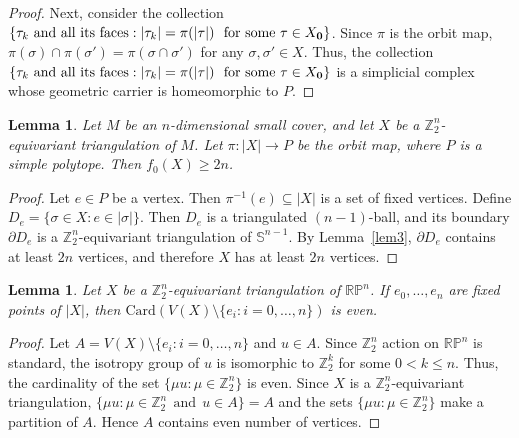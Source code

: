\documentclass[11pt]{amsart}
\numberwithin{equation}{section}
\newtheorem{lemma}[theorem]{Lemma}
\theoremstyle{definition}
\def \bb{\mathbb}
\def \ZZ{{\bb{Z}}}
\begin{document}
\begin{proof}
Next, consider the collection
$\{\tau_k \text{ and all its faces} : |\tau_k| = \pi(|\tau|) ~\mbox{ for some } \tau \in X_{\bf 0}\}$. Since $\pi$ is the orbit map, 
 $\pi(\sigma) \cap \pi(\sigma') = \pi(\sigma \cap \sigma')$
for any $\sigma,\sigma' \in X$.   Thus, the collection
$\{\tau_k \text{ and all its faces} : |\tau_k| = \pi(|\tau|) ~\mbox{ for some } \tau \in X_{\bf 0}\}$  is a simplicial complex whose geometric carrier is homeomorphic to $P$.
\end{proof}




\begin{lemma}
Let $M$ be an $n$-dimensional small cover, and let $X$ be a $\mathbb{Z}_2^n$-equivariant triangulation of $M$. Let $\pi \colon |X| \rightarrow P$ be the orbit map, where $P$ is a simple polytope. Then $f_0(X) \geq 2n$.
\end{lemma}

\begin{proof}
Let $e \in P$ be a vertex. Then $\pi^{-1}(e) \subseteq |X|$ is a set of fixed vertices. Define 
$D_e = \{\sigma \in X : e \in |\sigma|\}.$
Then $D_e$ is a triangulated $(n-1)$-ball, and its boundary $\partial D_e$ is a $\mathbb{Z}_2^n$-equivariant triangulation of $\mathbb{S}^{n-1}$. By Lemma~\ref{lem3}, $\partial D_e$ contains at least $2n$ vertices, and therefore $X$ has at least $2n$ vertices.
\end{proof}






\begin{lemma}\label{lem1}
Let $X$ be a $\ZZ_2^n$-equivariant triangulation of $\mathbb{RP}^{n}$. If $e_0, \ldots, e_{n}$ are fixed points of $|X|$, then $\mathrm{Card}(V(X)\setminus \{e_i : i=0, \ldots, n\})$ is even. 
\end{lemma}
\begin{proof}
Let $A = V(X)\setminus \{e_i : i= 0, \ldots, n\}$ and $u \in A$. Since $\ZZ_2^n$ action on $\mathbb{RP}^n$
is standard, the isotropy group of $u$ is isomorphic to $\ZZ_2^k$ for some $0 < k \leq n$. Thus, 
the cardinality of the set $\{\mu u : \mu\in \ZZ_2^n\}$ is  even. Since $X$ is a $\ZZ_2^n$-equivariant
triangulation, $\{\mu u : \mu\in \ZZ_2^n ~~\mbox{and}~~ u \in A\} = A$ and the sets $\{\mu u : \mu\in \ZZ_2^n\}$ make a partition of $A$. Hence $A$ contains even number of vertices.
\end{proof}
\end{document}

